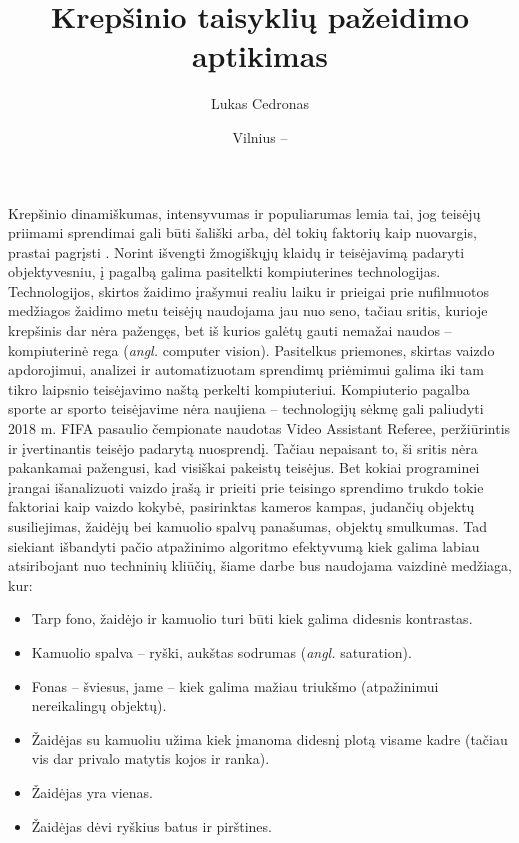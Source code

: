 \documentclass{VUMIFPSkursinis}
\title{Krepšinio taisyklių pažeidimo aptikimas}
\author{Lukas Cedronas}
\date{Vilnius – \the\year}
\begin{document}
\maketitle

\tableofcontents

Krepšinio dinamiškumas, intensyvumas ir populiarumas lemia tai, jog teisėjų priimami sprendimai gali būti šališki \cite{ProfitableBias} arba, dėl tokių faktorių kaip nuovargis, prastai pagrįsti \cite{MissedCalls}. Norint išvengti žmogiškųjų klaidų ir teisėjavimą padaryti objektyvesniu, į pagalbą galima pasitelkti kompiuterines technologijas. Technologijos, skirtos žaidimo įrašymui realiu laiku ir prieigai prie nufilmuotos medžiagos žaidimo metu teisėjų naudojama jau nuo seno, tačiau sritis, kurioje krepšinis dar nėra pažengęs, bet iš kurios galėtų gauti nemažai naudos – kompiuterinė rega (\textit{angl.} computer vision). Pasitelkus priemones, skirtas vaizdo apdorojimui, analizei ir automatizuotam sprendimų priėmimui galima iki tam tikro laipsnio teisėjavimo naštą perkelti kompiuteriui. Kompiuterio pagalba sporte ar sporto teisėjavime nėra naujiena – technologijų sėkmę gali paliudyti  2018 m. FIFA pasaulio čempionate naudotas Video Assistant Referee, peržiūrintis ir įvertinantis teisėjo padarytą nuosprendį. Tačiau nepaisant to, ši sritis nėra pakankamai pažengusi, kad visiškai pakeistų teisėjus. Bet kokiai programinei įrangai išanalizuoti vaizdo įrašą ir prieiti prie teisingo sprendimo trukdo tokie faktoriai kaip vaizdo kokybė, pasirinktas kameros kampas, judančių objektų susiliejimas, žaidėjų bei kamuolio spalvų panašumas, objektų smulkumas. Tad siekiant išbandyti pačio atpažinimo algoritmo efektyvumą kiek galima labiau atsiribojant nuo techninių kliūčių, šiame darbe bus naudojama vaizdinė medžiaga, kur:
\begin{itemize}
 \item Tarp fono, žaidėjo ir kamuolio turi būti kiek galima didesnis kontrastas.
 \item Kamuolio spalva – ryški, aukštas sodrumas (\textit{angl.} saturation).
 \item Fonas – šviesus, jame – kiek galima mažiau triukšmo (atpažinimui nereikalingų objektų).
 \item Žaidėjas su kamuoliu užima kiek įmanoma didesnį plotą visame kadre (tačiau vis dar privalo matytis kojos ir ranka).
 \item Žaidėjas yra vienas.
 \item Žaidėjas dėvi ryškius batus ir pirštines.
\end{itemize}
\end{document}
